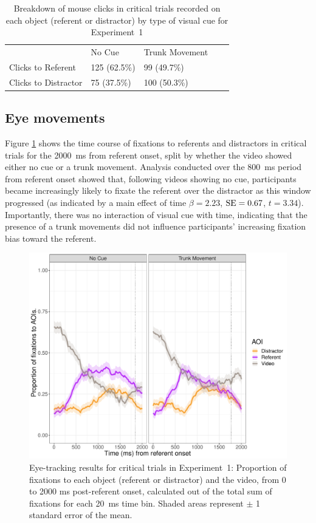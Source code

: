 \documentclass[a4paper,man,natbib]{apa6}
\newcommand{\resultsLM}[3]{$\beta = #1$, $\textnormal{SE} = #2$, $t #3$}
\begin{document}
\begin{table}
\caption{Breakdown of mouse clicks in critical trials recorded on each object (referent or distractor) by type of visual cue for Experiment~1}
\label{table:v1_clicks}
\begin{tabularx}{\linewidth}{YYYYY}
\hline
& No Cue & Trunk Movement \\
Clicks to Referent & 125 (62.5\%) & 99 (49.7\%) \\ 
Clicks to Distractor & 75 (37.5\%) & 100 (50.3\%) \\
\hline
\end{tabularx}
\end{table}

\subsection{Eye movements}
Figure \ref{fig:v1_eye1} shows the time course of fixations to referents and distractors in critical trials for the 2000~ms from referent onset, split by whether the video showed either no cue or a trunk movement.
Analysis conducted over the 800~ms period from referent onset showed that, following videos showing no cue, participants became increasingly likely to fixate the referent over the distractor as this window progressed (as indicated by a main effect of time \resultsLM{2.23}{0.67}{=3.34}).
Importantly, there was no interaction of visual cue with time, indicating that the presence of a trunk movements did not influence participants' increasing fixation bias toward the referent.

\begin{figure}[Ht]
  \centering
	\includegraphics[width=\linewidth]{./img/e7_fixations_crit.pdf}
  \caption{Eye-tracking results for critical trials in Experiment~1: Proportion of fixations to each object (referent or distractor) and the video, from 0 to 2000 ms post-referent onset, calculated out of the total sum of fixations for each 20~ms time bin. Shaded areas represent $\pm$ 1 standard error of the mean.}
  \label{fig:v1_eye1}
\end{figure}
\end{document}
